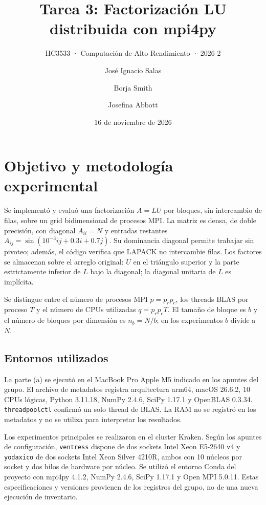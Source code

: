 \documentclass[
  spanish,
  11pt,
  a4paper,
]{article}
\title{Tarea 3: Factorización LU distribuida con mpi4py}
\subtitle{IIC3533 · Computación de Alto Rendimiento · 2026-2}
\author{José Ignacio Salas \and Borja Smith \and Josefina Abbott}
\date{16 de noviembre de 2026}
\begin{document}
\maketitle

\section{Objetivo y metodología
experimental}\label{objetivo-y-metodologuxeda-experimental}

Se implementó y evaluó una factorización \(A=LU\) por bloques, sin
intercambio de filas, sobre un grid bidimensional de procesos MPI. La
matriz es densa, de doble precisión, con diagonal \(A_{ii}=N\) y
entradas restantes \(A_{ij}=\sin(10^{-3}ij+0.3i+0.7j)\). Su dominancia
diagonal permite trabajar sin pivoteo; además, el código verifica que
LAPACK no intercambie filas. Los factores se almacenan sobre el arreglo
original: \(U\) en el triángulo superior y la parte estrictamente
inferior de \(L\) bajo la diagonal; la diagonal unitaria de \(L\) es
implícita.

Se distingue entre el número de procesos MPI \(p=p_rp_c\), los threads
BLAS por proceso \(T\) y el número de CPUs utilizadas \(q=p_rp_cT\). El
tamaño de bloque es \(b\) y el número de bloques por dimensión es
\(n_b=N/b\); en los experimentos \(b\) divide a \(N\).

\subsection{Entornos utilizados}\label{entornos-utilizados}

La parte (a) se ejecutó en el MacBook Pro Apple M5 indicado en los
apuntes del grupo. El archivo de metadatos registra arquitectura arm64,
macOS 26.6.2, 10 CPUs lógicas, Python 3.11.18, NumPy 2.4.6, SciPy 1.17.1
y OpenBLAS 0.3.34. \texttt{threadpoolctl} confirmó un solo thread de
BLAS. La RAM no se registró en los metadatos y no se utiliza para
interpretar los resultados.

Los experimentos principales se realizaron en el cluster Kraken. Según
los apuntes de configuración, \texttt{ventress} dispone de dos sockets
Intel Xeon E5-2640 v4 y \texttt{yodaxico} de dos sockets Intel Xeon
Silver 4210R, ambos con 10 núcleos por socket y dos hilos de hardware
por núcleo. Se utilizó el entorno Conda del proyecto con mpi4py 4.1.2,
NumPy 2.4.6, SciPy 1.17.1 y Open MPI 5.0.11. Estas especificaciones y
versiones provienen de los registros del grupo, no de una nueva
ejecución de inventario.
\end{document}
